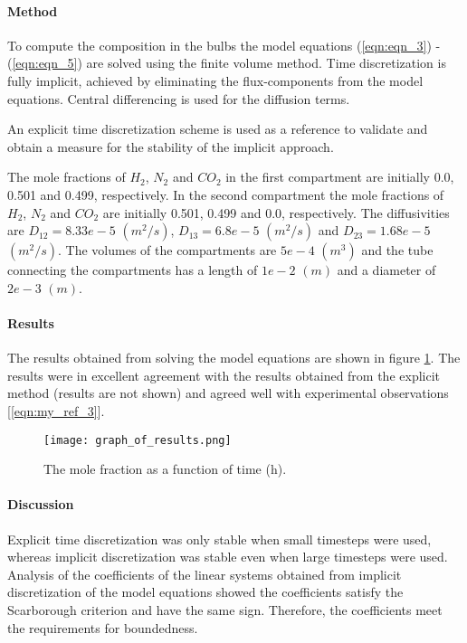 \documentclass[twocolumn]{article}
\begin{document}
\paragraph*{Method}
To compute the composition in the bulbs the model equations (\ref{eqn:eqn_3}) - (\ref{eqn:eqn_5}) are solved using the finite volume method. Time discretization is fully implicit, achieved by eliminating the flux-components from the model equations. Central differencing is used for the diffusion terms.

An explicit time discretization scheme is used as a reference to validate and obtain a measure for the stability of the implicit approach.

The mole fractions of $H_2$, $N_2$ and $CO_2$ in the first compartment are initially 0.0, 0.501 and 0.499, respectively. In the second compartment the mole fractions of $H_2$, $N_2$ and $CO_2$ are initially 0.501, 0.499 and 0.0, respectively. The diffusivities are $D_{12} = 8.33e-5$  $(m^2/s)$, $D_{13} = 6.8e-5$ $(m^2/s)$ and $D_{23} = 1.68e-5$ $(m^2/s)$. The volumes of the compartments are $5e-4$ $(m^3)$ and the tube connecting the compartments has a length of $1e-2$ $(m)$ and a diameter of $2e-3$ $(m)$. 

\paragraph*{Results} 
The results obtained from solving the model equations are shown in figure \ref{fig:fig_1}. The results were in excellent agreement with the results obtained from the explicit method (results are not shown) and agreed well with experimental observations [\ref{eqn:my_ref_3}].

\begin{figure}
\texttt{[image: graph\_of\_results.png]}
\caption{The mole fraction as a function of time (h).}
\label{fig:fig_1}
\end{figure}

\paragraph*{Discussion}
Explicit time discretization was only stable when small timesteps were used, whereas implicit discretization was stable even when large timesteps were used. Analysis of the coefficients of the linear systems obtained from implicit discretization of the model equations showed the coefficients satisfy the Scarborough criterion and have the same sign. Therefore, the coefficients meet the requirements for boundedness. 
\end{document}
